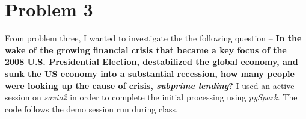 \documentclass{article}\usepackage[]{graphicx}\usepackage[]{color}
\begin{document}
\section{Problem 3}
From problem three, I wanted to investigate the the following question -- 
\newline
\newline
\textbf{In the wake of the growing financial crisis that became a key focus of the 2008 U.S. Presidential Election, destabilized the global economy, and sunk the US economy into a substantial recession, how many people were looking up the cause of crisis, \emph{subprime lending}?}
\newline
\newline
I used an active session on \emph{savio2} in order to complete the initial processing using \emph{pySpark}. The code follows the demo session run during class.
\end{document}
